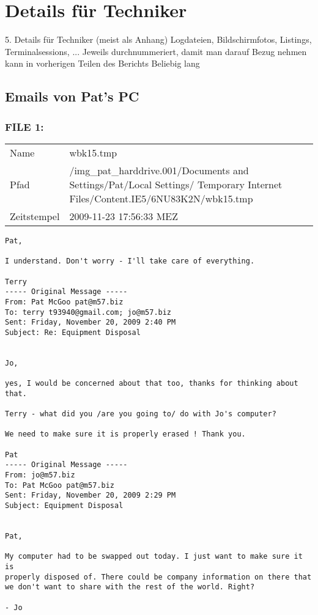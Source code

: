 \chapter{Details für Techniker}
\label{sec:details_tec}

5. Details für Techniker (meist als Anhang)
Logdateien, Bildschirmfotos, Listings, Terminalsessions, ...
Jeweils durchnummeriert, damit man darauf Bezug nehmen kann in vorherigen Teilen des Berichts
Beliebig lang

\section{Emails von Pat's PC}
\label{sec:pat_emails}

\subsection{FILE 1:}
\label{sec:pat_emails_1}

\begin{table}[htb]
	\begin{tabular}{p{2cm} p{13.5cm}}
		Name & wbk15.tmp\\
		Pfad & /img_pat_harddrive.001/Documents and Settings/Pat/Local Settings/ Temporary Internet Files/Content.IE5/6NU83K2N/wbk15.tmp\\
		Zeitstempel & 2009-11-23 17:56:33 MEZ
	\end{tabular}
\end{table}	

\begin{lstlisting}
Pat,

I understand. Don't worry - I'll take care of everything.

Terry
----- Original Message ----- 
From: Pat McGoo pat@m57.biz
To: terry t93940@gmail.com; jo@m57.biz
Sent: Friday, November 20, 2009 2:40 PM
Subject: Re: Equipment Disposal


Jo,

yes, I would be concerned about that too, thanks for thinking about 
that.

Terry - what did you /are you going to/ do with Jo's computer?

We need to make sure it is properly erased ! Thank you.

Pat
----- Original Message ----- 
From: jo@m57.biz
To: Pat McGoo pat@m57.biz
Sent: Friday, November 20, 2009 2:29 PM
Subject: Equipment Disposal


Pat,

My computer had to be swapped out today. I just want to make sure it is
properly disposed of. There could be company information on there that 
we don't want to share with the rest of the world. Right?

- Jo
\end{lstlisting}

